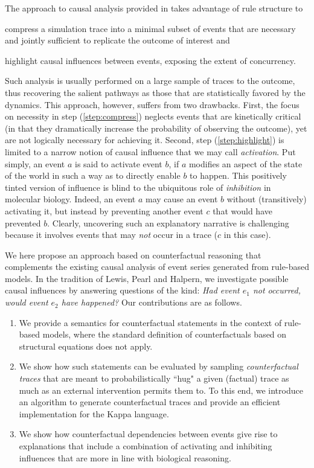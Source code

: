 The approach to causal analysis provided in
\cite{DBLP:conf/fsttcs/DanosFFHH12,DanosEtAl-CONCUR07} takes advantage
of rule structure to
\begin{inparaenum}[(i)]
\item \label{step:compress} compress a simulation trace into a minimal
  subset of events that are necessary and jointly sufficient to
  replicate the outcome of interest and
\item \label{step:highlight} highlight causal influences between
  events, exposing the extent of concurrency.
\end{inparaenum}
Such analysis is usually performed on a large sample of traces to the
outcome, thus recovering the salient pathways as those that are
statistically favored by the dynamics. This approach, however, suffers
from two drawbacks. First, the focus on necessity in step
(\ref{step:compress}) neglects events that are kinetically critical
(in that they dramatically increase the probability of observing the
outcome), yet are not logically necessary for achieving it. Second,
step (\ref{step:highlight}) is limited to a narrow notion of causal
influence that we may call \emph{activation}. Put simply, an event $a$
is said to activate event $b$, if $a$ modifies an aspect of the state
of the world in such a way as to directly enable $b$ to happen. This
positively tinted version of influence is blind to the ubiquitous role
of \emph{inhibition} in molecular biology.  Indeed, an event $a$ may
cause an event $b$ without (transitively) activating it, but instead
by preventing another event $c$ that would have prevented
$b$. Clearly, uncovering such an explanatory narrative is challenging
because it involves events that may \emph{not} occur in a trace ($c$
in this case).

We here propose an approach based on counterfactual reasoning that
complements the existing causal analysis of event series generated
from rule-based models. In the tradition of Lewis, Pearl and Halpern,
we investigate possible causal influences by answering questions of
the kind: \textit{Had event $e_1$ not occurred, would event $e_2$ have
  happened?}
Our contributions are as follows.
\begin{enumerate}
\item We provide a semantics for counterfactual statements in the
  context of rule-based models, where the standard definition of
  counterfactuals based on structural equations
  \cite{pearl2009causality} does not apply.
\item We show how such statements can be evaluated by sampling
  \emph{counterfactual traces} that are meant to probabilistically
  ``hug" a given (factual) trace as much as an external intervention
  permits them to. To this end, we introduce an algorithm to generate
  counterfactual traces and provide an efficient implementation for
  the Kappa language.
\item We show how counterfactual dependencies between events give rise
  to explanations that include a combination of activating and
  inhibiting influences that are more in line with biological
  reasoning.
\end{enumerate}
